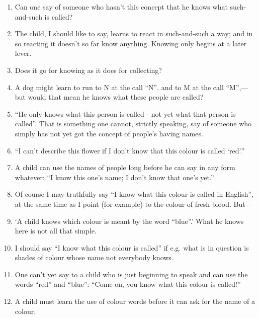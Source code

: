 \documentclass{book}
\begin{document}
\begin{enumerate}
\item
Can one say of someone who hasn't this concept that he knows what such-and-such
is called?

\item
The child, I should like to say, learns to react in such-and-such a way; and in
so reacting it doesn't so far know anything. Knowing only begins at a later
lever.

\item
Does it go for knowing as it does for collecting?

\item
A dog might learn to run to N at the call ``N'', and to M at the call
``M'',---but would that mean he knows what these people are called?

\item
``He only knows what this person is called---not yet what that person is
called''. That is something one cannot, strictly speaking, say of someone who
simply has not yet got the concept of people's having names.

\item
``I can't describe this flower if I don't know that this colour is called
`red'.''

\item
A child can use the names of people long before he can say in any form
whatever: ``I know this one's name; I don't know that one's yet.''

\item
Of course I may truthfully say ``I know what this colour is called in
English'', at the same time as I point (for example) to the colour of fresh
blood. But---

\item
`A child knows which colour is meant by the word ``blue''.' What he knows here
is not all that simple.

\item
I should say ``I know what this colour is called'' if e.g. what is in question
is shades of colour whose name not everybody knows.

\item
One can't yet say to a child who is just beginning to speak and can use the
words ``red'' and ``blue'': ``Come on, you know what this colour is called!''

\item
A child must learn the use of colour words before it can ask for the name of a
colour.


\end{enumerate}
\end{document}
